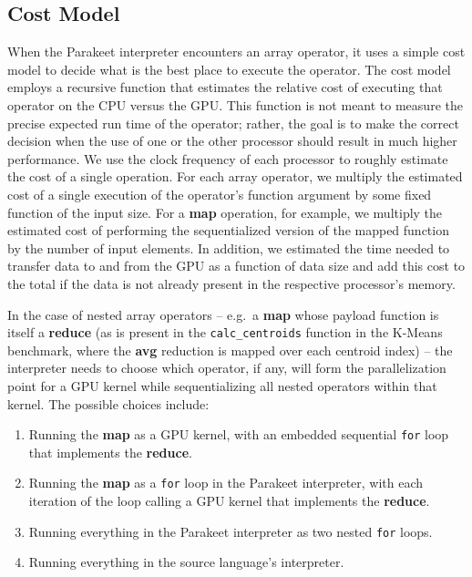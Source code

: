 \documentclass[preprint]{sigplanconf}
\begin{document}
\subsection{Cost Model}
\label{costmodel}

When the Parakeet interpreter encounters an array operator, it uses a simple cost model to decide what is the best place to execute the operator.  The cost model employs a recursive function that estimates the relative cost of executing that operator on the CPU versus the GPU.  This function is not meant to measure the precise expected run time of the operator; rather, the goal is to make the correct decision when the use of one or the other processor should result in much higher performance.  We use the clock frequency of each processor to roughly estimate the cost of a single operation.  For each array operator, we multiply the estimated cost of a single execution of the operator's function argument by some fixed function of the input size.  For a \textbf{map} operation, for example, we multiply the estimated cost of performing the sequentialized version of the mapped function by the number of input elements. In addition, we estimated the time needed to transfer data to and from the GPU as a function of data size and add this cost to the total if the data is not already present in the respective processor's memory.

In the case of nested array operators -- e.g.~a \textbf{map} whose payload function is itself a \textbf{reduce} (as is present in the \texttt{calc\_centroids} function in the K-Means benchmark, where the \textbf{avg} reduction is mapped over each centroid index) -- the interpreter needs to choose which operator, if any, will form the parallelization point for a GPU kernel while sequentializing all nested operators within that kernel.  The possible choices include:

\begin{enumerate}
\item Running the \textbf{map} as a GPU kernel, with an embedded sequential \texttt{for} loop that implements the \textbf{reduce}.
\item Running the \textbf{map} as a \texttt{for} loop in the Parakeet interpreter, with each iteration of the loop calling a GPU kernel that implements the \textbf{reduce}.
\item Running everything in the Parakeet interpreter as two nested \texttt{for} loops.
\item Running everything in the source language's interpreter.
\end{enumerate}
\end{document}
